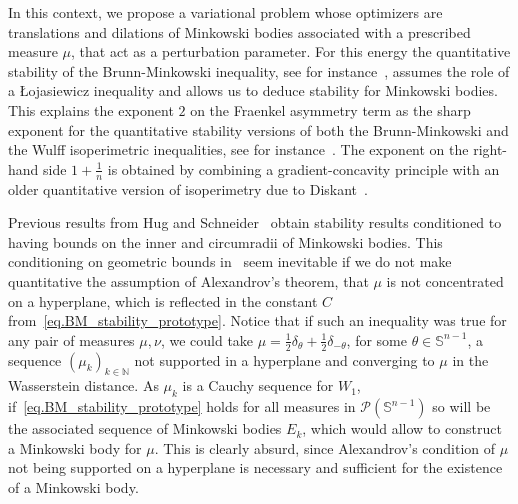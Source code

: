 \documentclass[a4paper, 10pt, twoside]{amsart}
\numberwithin{equation}{section}
\theoremstyle{plain}
\theoremstyle{definition}
\begin{document}
In this context, we propose a variational problem whose optimizers are translations and dilations of Minkowski bodies associated with a prescribed measure $\mu$, that act as a perturbation parameter. For this energy the quantitative stability of the Brunn-Minkowski inequality, see for instance~\cite{figalli2009refined,figalli2017quantitative,figalli2024sharp}, assumes the role of a Łojasiewicz inequality and allows us to deduce stability for Minkowski bodies. This explains the exponent $2$ on the Fraenkel asymmetry term as the sharp exponent for the quantitative stability versions of both the Brunn-Minkowski and the Wulff isoperimetric inequalities, see for instance~\cite{fusco2008sharp,figalli2010stability,figalli2017quantitative}. The exponent on the right-hand side $1 + \frac{1}{n}$ is obtained by combining a gradient-concavity principle with an older quantitative version of isoperimetry due to Diskant~\cite{diskant1972bounds}. 

Previous results from Hug and Schneider~\cite{hug2002stability} obtain stability results conditioned to having bounds on the inner and circumradii of Minkowski bodies. This conditioning on geometric bounds in~\cite{hug2002stability} seem inevitable if we do not make quantitative the assumption of Alexandrov's theorem, that $\mu$ is not concentrated on a hyperplane, which is reflected in the constant $C$ from~\eqref{eq.BM_stability_prototype}. Notice that if such an inequality was true for any pair of measures $\mu,\nu$, we could take $\mu = \frac{1}{2}\delta_\theta + \frac{1}{2}\delta_{-\theta}$, for some $\theta \in {\mathbb{S}}^{n-1}$, a sequence ${\left(\mu_k\right)}_{k \in \mathbb{N}}$ not supported in a hyperplane and converging to $\mu$ in the Wasserstein distance. As $\mu_k$ is a Cauchy sequence for $W_1$, if~\eqref{eq.BM_stability_prototype} holds for all measures in $\mathscr{P}(\mathbb{S}^{n-1})$ so will be the associated sequence of Minkowski bodies $E_k$, which would allow to construct a Minkowski body for $\mu$. This is clearly absurd, since Alexandrov's condition of $\mu$ not being supported on a hyperplane is necessary and sufficient for the existence of a Minkowski body.
\end{document}
